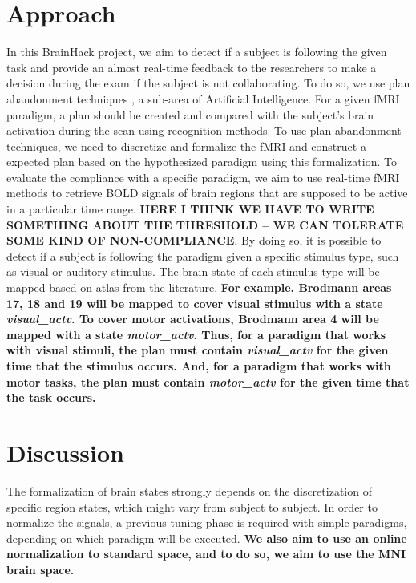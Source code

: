 \documentclass[twocolumn]{bmcart}%
\begin{document}
\section{Approach}\label{approach}

In this BrainHack project, we aim to detect if a subject is following
the given task and provide an almost real-time feedback to the
researchers to make a decision during the exam if the subject is not
collaborating. To do so, we use plan abandonment techniques
\cite{Sukthankar2014}, a sub-area of Artificial Intelligence. For a
given fMRI paradigm, a plan should be created and compared with the
subject's brain activation during the scan using recognition methods. To
use plan abandonment techniques, we need to discretize and formalize the
fMRI and construct a expected plan based on the hypothesized paradigm
using this formalization. To evaluate the compliance with a specific
paradigm, we aim to use real-time fMRI methods to retrieve BOLD signals
of brain regions that are supposed to be active in a particular time
range. \textbf{HERE I THINK WE HAVE TO WRITE SOMETHING ABOUT THE THRESHOLD -- WE CAN TOLERATE SOME KIND OF NON-COMPLIANCE}. By doing so, it is possible to detect if a subject is following
the paradigm given a specific stimulus type, such as visual or auditory
stimulus. The brain state of each stimulus type will be mapped based on
atlas from the literature. \textbf{For example, Brodmann areas 17, 18 and 19
will be mapped to cover visual stimulus with a state
\emph{visual\_actv}. To cover motor activations, Brodmann area 4 will be mapped 
with a state \emph{motor\_actv}. 
Thus, for a paradigm that works with visual stimuli,
the plan must contain \emph{visual\_actv} for the given time that the
stimulus occurs. And, for a paradigm that works with motor tasks, the plan must contain \emph{motor\_actv} for the given time that the task occurs.}

\section{Discussion}\label{discussion}

The formalization of brain states strongly depends on the discretization
of specific region states, which might vary from subject to subject. In
order to normalize the signals, a previous tuning phase is required
with simple paradigms, depending on which paradigm will be executed. 
\textbf{We also aim to use an online normalization to standard space, and to do so, we aim to use the MNI brain space.} 
\end{document}
